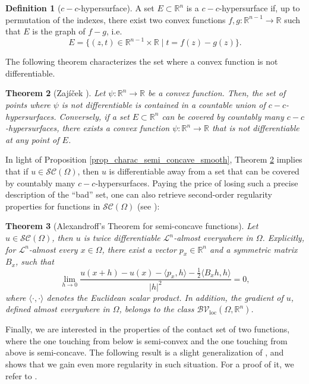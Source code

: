\documentclass[reqno]{amsart}
\theoremstyle{plain}
\newtheorem{thm}{Theorem}[section]
\theoremstyle{definition}
\newtheorem{Def}[thm]{Definition}
\theoremstyle{remark}
\begin{document}
    \begin{Def}[$c-c$-hypersurface]\label{def_c_c_hyper}
    A set $E\subset\mathbb{R}^n$ is a $c-c$-hypersurface if, up to permutation of the indexes, there exist two convex functions $f,g:\mathbb{R}^{n-1}\to\mathbb{R}$ such that $E$ is the graph of $f-g$, i.e.
    \begin{equation}
        E=\{(z,t)\in\mathbb{R}^{n-1}\times\mathbb{R}\mid t=f(z)-g(z)\}.
    \end{equation}
    \end{Def}
    The following theorem characterizes the set where a convex function is not differentiable.
    \begin{thm}[Zaj\'i\v cek \cite{zajicek1979}]\label{Zajicek_thm}
        Let $\psi:\mathbb{R}^n\to\mathbb{R}$ be a convex function. Then, the set of points where $\psi$ is not differentiable is contained in a countable union of $c-c$-hypersurfaces. Conversely, if a set $E\subset\mathbb{R}^n$ can be covered by countably many $c-c$-hypersurfaces, there exists a convex function $\psi:\mathbb{R}^n\to\mathbb{R}$ that is not differentiable at any point of $E$.
    \end{thm}
    In light of Proposition \ref{prop_charac_semi_concave_smooth}, Theorem \ref{Zajicek_thm} implies that if $u\in \mathcal{SC}(\Omega)$, then $u$ is differentiable away from a set that can be covered by countably many $c-c$-hypersurfaces. Paying the price of losing such a precise description of the ``bad'' set, one can also retrieve second-order regularity properties for functions in $\mathcal{SC}(\Omega)$ (see \cite[Theorem 2.3.1]{CannarsaSinestrari}):
	\begin{thm}[Alexandroff's Theorem for semi-concave functions]\label{Alexandroff's_theorem}
		Let $u\in \mathcal{SC}(\Omega)$, then $u$ is twice differentiable $\mathscr{L}^n$-almost everywhere in $\Omega$. Explicitly, for $\mathscr{L}^n$-almost every $x\in \Omega$, there exist a vector $p_x\in\mathbb{R}^n$ and a symmetric matrix $B_x$, such that
		\begin{equation}
			\lim\limits_{h\to 0}\frac{u(x+h)-u(x)-\langle p_x,h\rangle-\frac{1}{2}\langle B_xh,h\rangle}{|h|^2}=0,
		\end{equation}
		where $\langle\cdot,\cdot\rangle$ denotes the Euclidean scalar product. 
            In addition, the gradient of $u$, defined almost everywhere in $\Omega$, belongs to the class $\mathcal{BV}_{\mathrm{loc}}(\Omega,\mathbb{R}^n)$.
	\end{thm}
	Finally, we are interested in the properties of the contact set of two functions, where the one touching from below is semi-convex and the one touching from above is semi-concave. The following result is a slight generalization of \cite[Corollary 3.3.8]{CannarsaSinestrari}, and shows that we gain even more regularity in such situation. For a proof of it, we refer to \cite[Theorem A.19]{FathiFigalli}.
\end{document}
